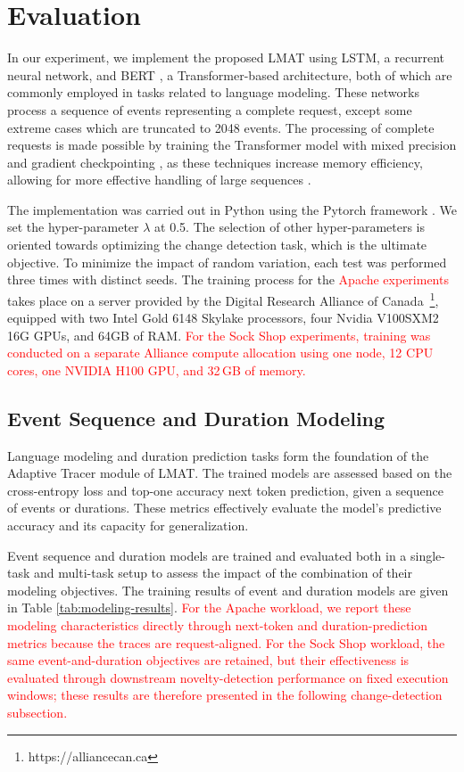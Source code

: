 \documentclass[preprint,12pt]{elsarticle}
\begin{document}
\section{Evaluation}\label{results}

In our experiment, we implement the proposed LMAT using LSTM, a recurrent neural network, and BERT \cite{devlin2018bert},  a Transformer-based architecture, both of which are commonly employed in tasks related to language modeling. These networks process a sequence of events representing a complete request, except some extreme cases which are truncated to 2048 events. The processing of complete requests is made possible by training the Transformer model with mixed precision \cite{micikevicius2018mixed} and gradient checkpointing \cite{chen2016training}, as these techniques increase memory efficiency, allowing for more effective handling of large sequences \cite{fournier2023language}.


The implementation was carried out in Python using the Pytorch framework \cite{paszke2019pytorch}. We set the hyper-parameter $\lambda$ at 0.5. The selection of other hyper-parameters is oriented towards optimizing the change detection task, which is the ultimate objective. To minimize the impact of random variation, each test was performed three times with distinct seeds. The training process for the \textcolor{red}{Apache experiments} takes place on a server provided by the Digital Research Alliance of Canada~\footnote{https://alliancecan.ca}, equipped with two Intel Gold 6148 Skylake processors, four Nvidia V100SXM2 16G GPUs, and 64GB of RAM. \textcolor{red}{For the Sock Shop experiments, training was conducted on a separate Alliance compute allocation using one node, 12 CPU cores, one NVIDIA H100 GPU, and 32\,GB of memory.}


\subsection{Event Sequence and Duration Modeling}
Language modeling and duration prediction tasks form the foundation of the Adaptive Tracer module of LMAT. The trained models are assessed based on the cross-entropy loss and top-one accuracy next token prediction, given a sequence of events or durations. These metrics effectively evaluate the model's predictive accuracy and its capacity for generalization.

Event sequence and duration models are trained and evaluated both in a single-task and multi-task setup to assess the impact of the combination of their modeling objectives. The training results of event and duration models are given in Table \ref{tab:modeling-results}. \textcolor{red}{For the Apache workload, we report these modeling characteristics directly through next-token and duration-prediction metrics because the traces are request-aligned. For the Sock Shop workload, the same event-and-duration objectives are retained, but their effectiveness is evaluated through downstream novelty-detection performance on fixed execution windows; these results are therefore presented in the following change-detection subsection.}
\end{document}
